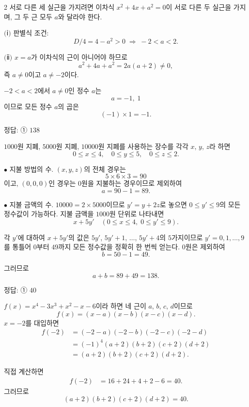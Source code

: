 \documentclass[10pt]{article}
\begin{document}
\begin{multicols}{2}
서로 다른 세 실근을 가지려면 이차식 $x^2 + 4x + a^2 = 0$이 서로 다른 두 실근을 가지며, 그 두 근 모두 $a$와 달라야 한다.

$(\!$ⅰ$)$ 판별식 조건:
\[ D/4 = 4 - a^2 > 0 \;\Rightarrow\; -2 < a < 2. \]

$(\!$ⅱ$)$ $x = a$가 이차식의 근이 아니어야 하므로
\[ a^2 + 4a + a^2 = 2a(a+2) \ne 0, \]
즉 $a \ne 0$이고 $a \ne -2$이다.

$-2 < a < 2$에서 $a \ne 0$인 정수 $a$는
\[ a = -1,\; 1 \]
이므로 모든 정수 $a$의 곱은
\[ (-1) \times 1 = -1. \]

\begin{answerbox}정답: ① $138$\end{answerbox}

$1000$원 지폐, $5000$원 지폐, $10000$원 지폐를 사용하는 장수를 각각 $x$, $y$, $z$라 하면
\[ 0 \le x \le 4,\quad 0 \le y \le 5,\quad 0 \le z \le 2. \]

$\bullet$ 지불 방법의 수. $(x, y, z)$의 전체 경우는
\[ 5 \times 6 \times 3 = 90 \]
이고, $(0, 0, 0)$인 경우는 $0$원을 지불하는 경우이므로 제외하여
\[ a = 90 - 1 = 89. \]

$\bullet$ 지불 금액의 수. $10000 = 2 \times 5000$이므로 $y' = y + 2z$로 놓으면 $0 \le y' \le 9$의 모든 정수값이 가능하다. 지불 금액을 $1000$원 단위로 나타내면
\[ x + 5y' \quad (0 \le x \le 4,\; 0 \le y' \le 9). \]

각 $y'$에 대하여 $x + 5y'$의 값은 $5y'$, $5y'+1$, $\ldots$, $5y'+4$의 $5$가지이므로 $y' = 0, 1, \ldots, 9$를 통틀어 $0$부터 $49$까지 모든 정수값을 정확히 한 번씩 얻는다. $0$원은 제외하여
\[ b = 50 - 1 = 49. \]

그러므로
\[ a + b = 89 + 49 = 138. \]

\begin{answerbox}정답: ① $40$\end{answerbox}

$f(x) = x^4 - 3x^3 + x^2 - x - 6$이라 하면 네 근이 $a$, $b$, $c$, $d$이므로
\[ f(x) = (x - a)(x - b)(x - c)(x - d). \]
$x = -2$를 대입하면
\begin{align*}
f(-2) &= (-2 - a)(-2 - b)(-2 - c)(-2 - d) \\
&= (-1)^4 (a + 2)(b + 2)(c + 2)(d + 2) \\
&= (a + 2)(b + 2)(c + 2)(d + 2).
\end{align*}

직접 계산하면
\begin{align*}
f(-2) &= 16 + 24 + 4 + 2 - 6 = 40.
\end{align*}
그러므로
\[ (a+2)(b+2)(c+2)(d+2) = 40. \]


\end{multicols}
\end{document}
